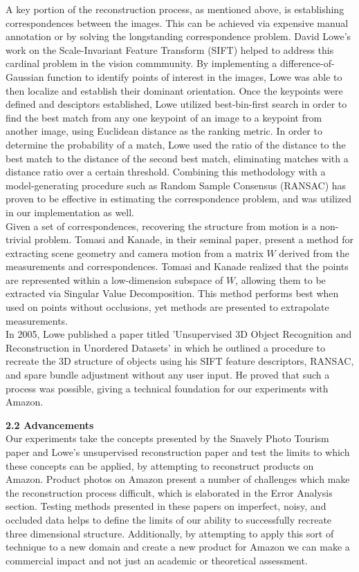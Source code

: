 \documentclass[12pt]{article}
\begin{document}
\begin{multicols}{2}
\indent A key portion of the reconstruction process, as mentioned above, is establishing correspondences between the images. This can be achieved via expensive manual annotation or by solving the longstanding correspondence problem. David Lowe's work on the Scale-Invariant Feature Transform (SIFT) helped to address this cardinal problem in the vision commmunity. By implementing a difference-of-Gaussian function to identify points of interest in the images, Lowe was able to then localize and establish their dominant orientation. Once the keypoints were defined and desciptors established, Lowe utilized best-bin-first search in order to find the best match from any one keypoint of an image to a keypoint from another image, using Euclidean distance as the ranking metric. In order to determine the probability of a match, Lowe used the ratio of the distance to the best match to the distance of the second best match, eliminating matches with a distance ratio over a certain threshold. Combining this methodology with a model-generating procedure such as Random Sample Consensus (RANSAC) has proven to be effective in estimating the correspondence problem, and was utilized in our implementation as well. \\
\indent Given a set of correspondences, recovering the structure from motion is a non-trivial problem. Tomasi and Kanade, in their seminal paper, present a method for extracting scene geometry and camera motion from a matrix $W$ derived from the measurements and correspondences. Tomasi and Kanade realized that the points are represented within a low-dimension subspace of $W$, allowing them to be extracted via Singular Value Decomposition. This method performs best when used on points without occlusions, yet methods are presented to extrapolate measurements. \\
\indent In 2005, Lowe published a paper titled 'Unsupervised 3D Object Recognition and Reconstruction in Unordered Datasets' in which he outlined a procedure to recreate the 3D structure of objects using his SIFT feature descriptors, RANSAC, and spare bundle adjustment without any user input. He proved that such a process was possible, giving a technical foundation for our experiments with Amazon. 

{\large \textbf{2.2 Advancements}}\\
Our experiments take the concepts presented by the Snavely Photo Tourism paper and Lowe's unsupervised reconstruction paper and test the limits to which these concepts can be applied, by attempting to reconstruct products on Amazon. Product photos on Amazon present a number of challenges which make the reconstruction process difficult, which is elaborated in the Error Analysis section. Testing methods presented in these papers on imperfect, noisy, and occluded data helps to define the limits of our ability to successfully recreate three dimensional structure. Additionally, by attempting to apply this sort of technique to a new domain and create a new product for Amazon we can make a commercial impact and not just an academic or theoretical assessment. \\


\end{multicols}
\end{document}
